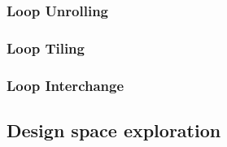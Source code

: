 \subsubsection{Loop Unrolling}
\subsubsection{Loop Tiling}
\subsubsection{Loop Interchange}
\subsection{Design space exploration}
